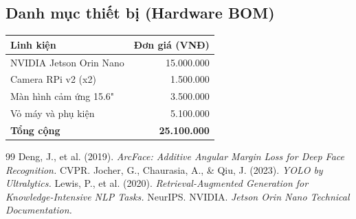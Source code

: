 \documentclass[12pt,a4paper]{article}
\begin{document}
\subsection{Danh mục thiết bị (Hardware BOM)}
\begin{table}[H]
    \centering
    \begin{tabular}{lr}
        \toprule
        \textbf{Linh kiện} & \textbf{Đơn giá (VNĐ)} \\
        \midrule
        NVIDIA Jetson Orin Nano & 15.000.000 \\
        Camera RPi v2 (x2) & 1.500.000 \\
        Màn hình cảm ứng 15.6" & 3.500.000 \\
        Vỏ máy và phụ kiện & 5.100.000 \\
        \midrule
        \textbf{Tổng cộng} & \textbf{25.100.000} \\
        \bottomrule
    \end{tabular}
\end{table}

\begin{thebibliography}{99}
 Deng, J., et al. (2019). \textit{ArcFace: Additive Angular Margin Loss for Deep Face Recognition.} CVPR.
 Jocher, G., Chaurasia, A., \& Qiu, J. (2023). \textit{YOLO by Ultralytics.}
 Lewis, P., et al. (2020). \textit{Retrieval-Augmented Generation for Knowledge-Intensive NLP Tasks.} NeurIPS.
 NVIDIA. \textit{Jetson Orin Nano Technical Documentation.}
\end{thebibliography}
\end{document}
